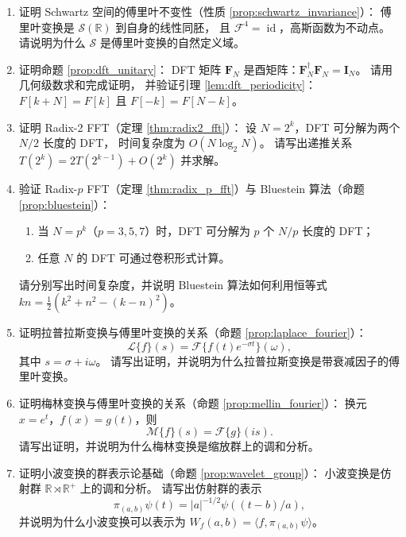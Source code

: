 \begin{enumerate}[leftmargin=3em, label=\textbf{题 \arabic*}]
    \item 证明 Schwartz 空间的傅里叶不变性（性质 \ref{prop:schwartz_invariance}）：
    傅里叶变换是 $\mathcal{S}(\mathbb{R})$ 到自身的线性同胚，
    且 $\mathcal{F}^4=\operatorname{id}$，高斯函数为不动点。
    请说明为什么 $\mathcal{S}$ 是傅里叶变换的自然定义域。

    \item 证明命题 \ref{prop:dft_unitary}：
    DFT 矩阵 $\mathbf{F}_N$ 是酉矩阵：$\mathbf{F}_N^\dagger\mathbf{F}_N=\mathbf{I}_N$。
    请用几何级数求和完成证明，
    并验证引理 \ref{lem:dft_periodicity}：
    $F[k+N]=F[k]$ 且 $F[-k]=F[N-k]$。

    \item 证明 Radix-2 FFT（定理 \ref{thm:radix2_fft}）：
    设 $N=2^k$，DFT 可分解为两个 $N/2$ 长度的 DFT，
    时间复杂度为 $O(N\log_2N)$。
    请写出递推关系 $T(2^k)=2T(2^{k-1})+O(2^k)$ 并求解。

    \item 验证 Radix-$p$ FFT（定理 \ref{thm:radix_p_fft}）与 Bluestein 算法（命题 \ref{prop:bluestein}）：
    \begin{enumerate}[label=(\roman*)]
        \item 当 $N=p^k$（$p=3,5,7$）时，DFT 可分解为 $p$ 个 $N/p$ 长度的 DFT；
        \item 任意 $N$ 的 DFT 可通过卷积形式计算。
    \end{enumerate}
    请分别写出时间复杂度，并说明 Bluestein 算法如何利用恒等式
    $kn=\frac12(k^2+n^2-(k-n)^2)$。

    \item 证明拉普拉斯变换与傅里叶变换的关系（命题 \ref{prop:laplace_fourier}）：
    \[
    \mathcal{L}\{f\}(s)=\mathcal{F}\{f(t)e^{-\sigma t}\}(\omega),
    \]
    其中 $s=\sigma+i\omega$。
    请写出证明，并说明为什么拉普拉斯变换是带衰减因子的傅里叶变换。

    \item 证明梅林变换与傅里叶变换的关系（命题 \ref{prop:mellin_fourier}）：
    换元 $x=e^t$，$f(x)=g(t)$，则
    \[
    \mathcal{M}\{f\}(s)=\mathcal{F}\{g\}(is).
    \]
    请写出证明，并说明为什么梅林变换是缩放群上的调和分析。

    \item 证明小波变换的群表示论基础（命题 \ref{prop:wavelet_group}）：
    小波变换是仿射群 $\mathbb{R}\rtimes\mathbb{R}^+$ 上的调和分析。
    请写出仿射群的表示
    \[
    \pi_{(a,b)}\psi(t)=|a|^{-1/2}\psi((t-b)/a),
    \]
    并说明为什么小波变换可以表示为
    $W_f(a,b)=\langle f,\pi_{(a,b)}\psi\rangle$。


\end{enumerate}
